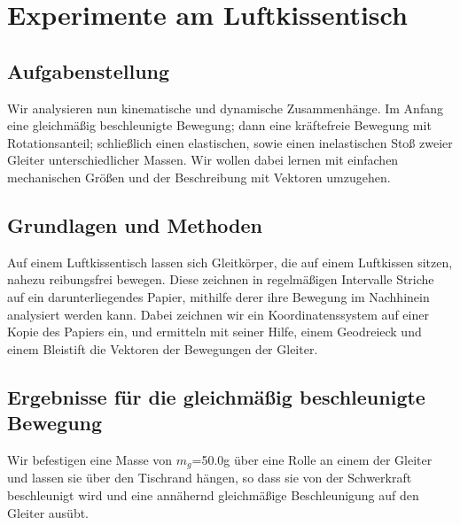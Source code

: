 \documentclass{article}
\begin{document}
\section{Experimente am Luftkissentisch}

\subsection{Aufgabenstellung}
Wir analysieren nun kinematische und dynamische Zusammenhänge. 
Im Anfang eine gleichmäßig beschleunigte Bewegung; dann eine kräftefreie Bewegung mit Rotationsanteil; schließlich einen elastischen, sowie einen inelastischen Stoß zweier Gleiter unterschiedlicher Massen. Wir wollen dabei lernen mit einfachen mechanischen Größen und der Beschreibung mit Vektoren umzugehen. 

\subsection{Grundlagen und Methoden}

Auf einem Luftkissentisch lassen sich Gleitkörper, die auf einem Luftkissen sitzen, nahezu reibungsfrei bewegen. Diese zeichnen in regelmäßigen Intervalle Striche auf ein darunterliegendes Papier, mithilfe derer ihre Bewegung im Nachhinein analysiert werden kann. Dabei zeichnen wir ein Koordinatenssystem auf einer Kopie des Papiers ein, und ermitteln mit seiner Hilfe, einem Geodreieck und einem Bleistift die Vektoren der Bewegungen der Gleiter.



\subsection{Ergebnisse für die gleichmäßig beschleunigte Bewegung}
 Wir befestigen eine Masse von $m_g$=50.0g über eine Rolle an einem der Gleiter und lassen sie über den Tischrand hängen, so dass sie von der Schwerkraft beschleunigt wird und eine annähernd gleichmäßige Beschleunigung auf den Gleiter ausübt.
\end{document}
